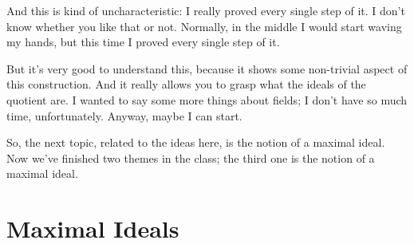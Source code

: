 \begin{hidden}
\end{hidden}

\begin{speech}[00:36:36 - 00:37:56]
And this is kind of uncharacteristic: I really proved every single step of it. I don't know whether you like that or not. Normally, in the middle I would start waving my hands, but this time I proved every single step of it.


But it's very good to understand this, because it shows some non-trivial aspect of this construction. And it really allows you to grasp what the ideals of the quotient are. I wanted to say some more things about fields; I don't have so much time, unfortunately. Anyway, maybe I can start.

So, the next topic, related to the ideas here, is the notion of a maximal ideal. Now we've finished two themes in the class; the third one is the notion of a maximal ideal.
\end{speech}

\section{Maximal Ideals}

